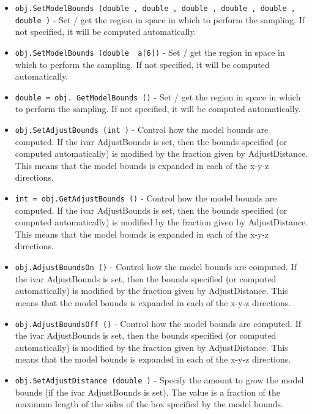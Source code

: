 \begin{itemize}
\item  \verb|obj.SetModelBounds (double , double , double , double , double , double )| -  Set / get the region in space in which to perform the sampling. If
 not specified, it will be computed automatically.

\item  \verb|obj.SetModelBounds (double  a[6])| -  Set / get the region in space in which to perform the sampling. If
 not specified, it will be computed automatically.

\item  \verb|double = obj. GetModelBounds ()| -  Set / get the region in space in which to perform the sampling. If
 not specified, it will be computed automatically.

\item  \verb|obj.SetAdjustBounds (int )| -  Control how the model bounds are computed. If the ivar AdjustBounds
 is set, then the bounds specified (or computed automatically) is modified
 by the fraction given by AdjustDistance. This means that the model
 bounds is expanded in each of the x-y-z directions.

\item  \verb|int = obj.GetAdjustBounds ()| -  Control how the model bounds are computed. If the ivar AdjustBounds
 is set, then the bounds specified (or computed automatically) is modified
 by the fraction given by AdjustDistance. This means that the model
 bounds is expanded in each of the x-y-z directions.

\item  \verb|obj.AdjustBoundsOn ()| -  Control how the model bounds are computed. If the ivar AdjustBounds
 is set, then the bounds specified (or computed automatically) is modified
 by the fraction given by AdjustDistance. This means that the model
 bounds is expanded in each of the x-y-z directions.

\item  \verb|obj.AdjustBoundsOff ()| -  Control how the model bounds are computed. If the ivar AdjustBounds
 is set, then the bounds specified (or computed automatically) is modified
 by the fraction given by AdjustDistance. This means that the model
 bounds is expanded in each of the x-y-z directions.

\item  \verb|obj.SetAdjustDistance (double )| -  Specify the amount to grow the model bounds (if the ivar AdjustBounds
 is set). The value is a fraction of the maximum length of the sides
 of the box specified by the model bounds.


\end{itemize}
